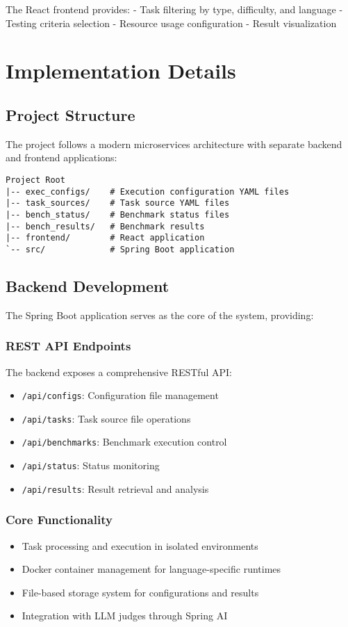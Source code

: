 The React frontend provides:
- Task filtering by type, difficulty, and language
- Testing criteria selection
- Resource usage configuration
- Result visualization

\chapter{Implementation Details}

\section{Project Structure}

The project follows a modern microservices architecture with separate backend and frontend applications:

\begin{verbatim}
Project Root
|-- exec_configs/    # Execution configuration YAML files
|-- task_sources/    # Task source YAML files
|-- bench_status/    # Benchmark status files
|-- bench_results/   # Benchmark results
|-- frontend/        # React application
`-- src/             # Spring Boot application
\end{verbatim}

\section{Backend Development}

The Spring Boot application serves as the core of the system, providing:

\subsection{REST API Endpoints}
The backend exposes a comprehensive RESTful API:
\begin{itemize}
    \item \texttt{/api/configs}: Configuration file management
    \item \texttt{/api/tasks}: Task source file operations
    \item \texttt{/api/benchmarks}: Benchmark execution control
    \item \texttt{/api/status}: Status monitoring
    \item \texttt{/api/results}: Result retrieval and analysis
\end{itemize}

\subsection{Core Functionality}
\begin{itemize}
    \item Task processing and execution in isolated environments
    \item Docker container management for language-specific runtimes
    \item File-based storage system for configurations and results
    \item Integration with LLM judges through Spring AI
\end{itemize}

